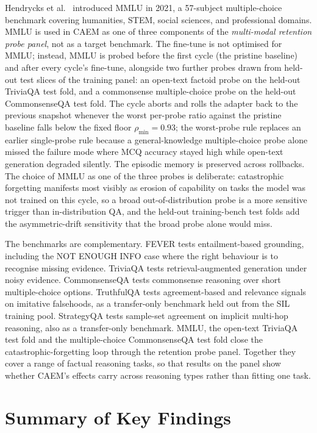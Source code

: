 Hendrycks et al.~\cite{hendrycks2021measuring} introduced MMLU in 2021, a 57-subject multiple-choice benchmark covering humanities, STEM, social sciences, and professional domains. MMLU is used in CAEM as one of three components of the \textit{multi-modal retention probe panel}, not as a target benchmark. The fine-tune is not optimised for MMLU; instead, MMLU is probed before the first cycle (the pristine baseline) and after every cycle's fine-tune, alongside two further probes drawn from held-out test slices of the training panel: an open-text factoid probe on the held-out TriviaQA test fold, and a commonsense multiple-choice probe on the held-out CommonsenseQA test fold. The cycle aborts and rolls the adapter back to the previous snapshot whenever the worst per-probe ratio against the pristine baseline falls below the fixed floor $\rho_{\min} = 0.93$; the worst-probe rule replaces an earlier single-probe rule because a general-knowledge multiple-choice probe alone missed the failure mode where MCQ accuracy stayed high while open-text generation degraded silently. The episodic memory is preserved across rollbacks. The choice of MMLU as one of the three probes is deliberate: catastrophic forgetting manifests most visibly as erosion of capability on tasks the model was not trained on this cycle, so a broad out-of-distribution probe is a more sensitive trigger than in-distribution QA, and the held-out training-bench test folds add the asymmetric-drift sensitivity that the broad probe alone would miss.

The benchmarks are complementary. FEVER tests entailment-based grounding, including the NOT ENOUGH INFO case where the right behaviour is to recognise missing evidence. TriviaQA tests retrieval-augmented generation under noisy evidence. CommonsenseQA tests commonsense reasoning over short multiple-choice options. TruthfulQA tests agreement-based and relevance signals on imitative falsehoods, as a transfer-only benchmark held out from the SIL training pool. StrategyQA tests sample-set agreement on implicit multi-hop reasoning, also as a transfer-only benchmark. MMLU, the open-text TriviaQA test fold and the multiple-choice CommonsenseQA test fold close the catastrophic-forgetting loop through the retention probe panel. Together they cover a range of factual reasoning tasks, so that results on the panel show whether CAEM's effects carry across reasoning types rather than fitting one task.

\section{Summary of Key Findings}

